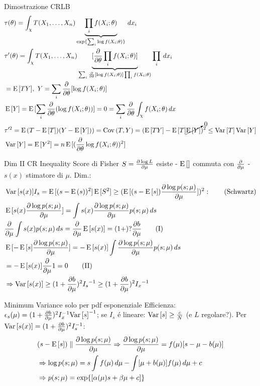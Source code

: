 \documentclass[asd-beamer.tex]{subfiles}%
\begin{document}
\begin{frame}[t]{Dimostrazione CRLB}
	\begin{align*}
	&\tau(\theta)=\int_{\chi}T(X_1,\ldots,X_n)\underbrace{\prod_if(X_i;\theta)}_{\text{exp}\{\sum_i\log{f(X_i;\theta)}\}}\,dx_i\\
	&\tau'(\theta)=\int_{\chi}T(X_1,\ldots,X_n)\underbrace{[\frac{\partial}{\partial \theta}\prod_if(X_i;\theta)]}_{\sum_i\frac{\partial}{\partial \theta}[\log{f(X_i;\theta)}]\prod_if(X_i;\theta)}\prod_i\,dx_i\\
	&=\operatorname{E}{[TY]},\ Y=\sum_i\frac{\partial}{\partial \theta}[\log{f(X_i;\theta)}]\\
	&\operatorname{E}{[Y]}=\operatorname{E}{[\sum_i\frac{\partial}{\partial \theta}(\log{f(X_i;\theta)})]}=0=\sum_i\frac{\partial}{\partial \theta}\int_{\chi}f(X_i;\theta)\,dx\\
	&\tau'^2=\operatorname{E}{(T-\operatorname{E}{[T]})(Y-\operatorname{E}{[Y]}))}=\operatorname{Cov}{(T,Y)}=(\operatorname{E}{[TY]}-\operatorname{E}{[T]}\cancelto{0}{\operatorname{E}{[Y]}})^2\leq \operatorname{Var}{[T]}\operatorname{Var}{[Y]}\\
	&\operatorname{Var}{[Y]}=\operatorname{E}{[Y^2]}=n\operatorname{E}{[(\frac{\partial}{\partial \theta}\log{f(X_i;\theta)})^2]}
	\end{align*}
\end{frame}

\begin{frame}{Dim II CR Inequality}
Score di Fisher $S=\frac{\partial \log{L}}{\partial \mu}$ esiste - $\operatorname{E}{[]}$ commuta con $\frac{\partial}{\partial \mu}$ - $s(x)$ stimatore di $\mu$.
Dim.:
\begin{align*}
&\operatorname{Var}{[s(x)]}I_s=\operatorname{E}{[(s-\operatorname{E}{(s)})^2]}\operatorname{E}{[S^2]}\geq(\operatorname{E}{[(s-\operatorname{E}{[s]})\frac{\partial \log{p(s;\mu)}}{\partial \mu}]})^2:\tag{Schwartz}\\
&\operatorname{E}{[s(x)\frac{\partial \log{p(s;\mu)}}{\partial \mu}]}=\int s(x)\frac{\partial \log{p(s;\mu)}}{\partial \mu}p(s;\mu)\,ds\\
&\frac{\partial}{\partial \mu}\int s(x)p(s;\mu)\,ds=\frac{\partial}{\partial \mu}\operatorname{E}{[s(x)]}=(1+)?\frac{\partial b}{\partial \mu}\tag{I}\\
&\operatorname{E}{[-\operatorname{E}{[s]}\frac{\partial \log{p(s;\mu)}}{\partial \mu}]}=-\operatorname{E}{[s(x)]}\int\frac{\partial \log{p(s;\mu)}}{\partial \mu}p(s;\mu)\,ds\\
&=-\operatorname{E}{[s(x)]}\frac{\partial}{\partial \mu}1=0\tag{II}\\
&\Rightarrow\operatorname{Var}{[s(x)]}\geq(1+\frac{\partial b}{\partial \mu})^2{I_s}^{-1}\geq(1+\frac{\partial b}{\partial \mu})^2{I_x}^{-1}
\end{align*}
\end{frame}

\begin{frame}{Minimum Variance solo per pdf esponenziale}
Efficienza: $\epsilon_s(\mu)=(1+\frac{\partial b}{\partial \mu})^2{I}^{-1}_x{\operatorname{Var}{}[s]}^{-1}$; se $I_s$ \'e lineare: $\operatorname{Var}{[s]}\geq\frac{c}{N}$ (e $L$ regolare?).
Per $\operatorname{Var}{[s(x)]}=(1+\frac{\partial b}{\partial \mu})^2{I}^{-1}_s$:
\begin{align*}
&(s-\operatorname{E}{[s]})\parallel\frac{\partial \log{p(s;\mu)}}{\partial \mu}\Rightarrow\frac{\partial \log{p(s;\mu)}}{\partial \mu}=f(\mu)[s-\mu-b(\mu)]\\
&\Rightarrow\log{p(s;\mu)}=s\int f(\mu)\,d\mu-\int[\mu+b(\mu)]f(\mu)\,d\mu+c\\
&\Rightarrow p(s;\mu)=\text{exp}\{[\alpha(\mu)s+\beta\mu+c]\}
\end{align*}
\end{frame}
\end{document}
